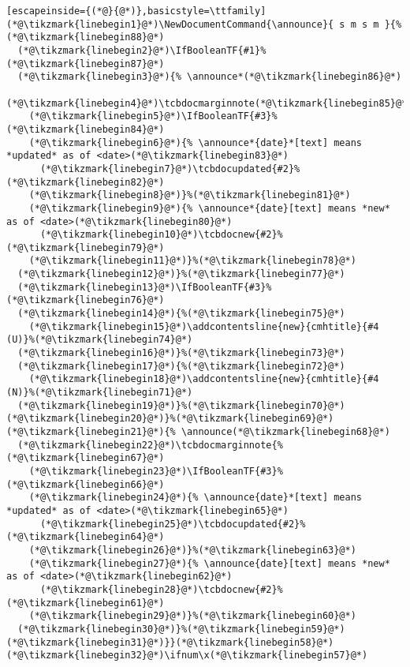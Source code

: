 \documentclass[11pt]{article}
\newcommand{\tikzmark}[1]{%
  \tikz[overlay,remember picture] \node[text=black,
    inner sep=2pt] (#1) {};}
\begin{document}
\pagestyle{empty}
\pagecolor{black}
\begin{lstlisting}[escapeinside={(*@}{@*)},basicstyle=\ttfamily]
(*@\tikzmark{linebegin1}@*)\NewDocumentCommand{\announce}{ s m s m }{%(*@\tikzmark{linebegin88}@*)
  (*@\tikzmark{linebegin2}@*)\IfBooleanTF{#1}%(*@\tikzmark{linebegin87}@*)
  (*@\tikzmark{linebegin3}@*){% \announce*(*@\tikzmark{linebegin86}@*)
    (*@\tikzmark{linebegin4}@*)\tcbdocmarginnote(*@\tikzmark{linebegin85}@*)
    (*@\tikzmark{linebegin5}@*)\IfBooleanTF{#3}%(*@\tikzmark{linebegin84}@*)
    (*@\tikzmark{linebegin6}@*){% \announce*{date}*[text] means *updated* as of <date>(*@\tikzmark{linebegin83}@*)
      (*@\tikzmark{linebegin7}@*)\tcbdocupdated{#2}%(*@\tikzmark{linebegin82}@*)
    (*@\tikzmark{linebegin8}@*)}%(*@\tikzmark{linebegin81}@*)
    (*@\tikzmark{linebegin9}@*){% \announce*{date}[text] means *new* as of <date>(*@\tikzmark{linebegin80}@*)
      (*@\tikzmark{linebegin10}@*)\tcbdocnew{#2}%(*@\tikzmark{linebegin79}@*)
    (*@\tikzmark{linebegin11}@*)}%(*@\tikzmark{linebegin78}@*)
  (*@\tikzmark{linebegin12}@*)}%(*@\tikzmark{linebegin77}@*)
  (*@\tikzmark{linebegin13}@*)\IfBooleanTF{#3}%(*@\tikzmark{linebegin76}@*)
  (*@\tikzmark{linebegin14}@*){%(*@\tikzmark{linebegin75}@*)
    (*@\tikzmark{linebegin15}@*)\addcontentsline{new}{cmhtitle}{#4 (U)}%(*@\tikzmark{linebegin74}@*)
  (*@\tikzmark{linebegin16}@*)}%(*@\tikzmark{linebegin73}@*)
  (*@\tikzmark{linebegin17}@*){%(*@\tikzmark{linebegin72}@*)
    (*@\tikzmark{linebegin18}@*)\addcontentsline{new}{cmhtitle}{#4 (N)}%(*@\tikzmark{linebegin71}@*)
  (*@\tikzmark{linebegin19}@*)}%(*@\tikzmark{linebegin70}@*)
(*@\tikzmark{linebegin20}@*)}%(*@\tikzmark{linebegin69}@*)
(*@\tikzmark{linebegin21}@*){% \announce(*@\tikzmark{linebegin68}@*)
  (*@\tikzmark{linebegin22}@*)\tcbdocmarginnote{%(*@\tikzmark{linebegin67}@*)
    (*@\tikzmark{linebegin23}@*)\IfBooleanTF{#3}%(*@\tikzmark{linebegin66}@*)
    (*@\tikzmark{linebegin24}@*){% \announce{date}*[text] means *updated* as of <date>(*@\tikzmark{linebegin65}@*)
      (*@\tikzmark{linebegin25}@*)\tcbdocupdated{#2}%(*@\tikzmark{linebegin64}@*)
    (*@\tikzmark{linebegin26}@*)}%(*@\tikzmark{linebegin63}@*)
    (*@\tikzmark{linebegin27}@*){% \announce{date}[text] means *new* as of <date>(*@\tikzmark{linebegin62}@*)
      (*@\tikzmark{linebegin28}@*)\tcbdocnew{#2}%(*@\tikzmark{linebegin61}@*)
    (*@\tikzmark{linebegin29}@*)}%(*@\tikzmark{linebegin60}@*)
  (*@\tikzmark{linebegin30}@*)}%(*@\tikzmark{linebegin59}@*)
(*@\tikzmark{linebegin31}@*)}}(*@\tikzmark{linebegin58}@*)
(*@\tikzmark{linebegin32}@*)\ifnum\x(*@\tikzmark{linebegin57}@*)

\end{lstlisting}
\end{document}
